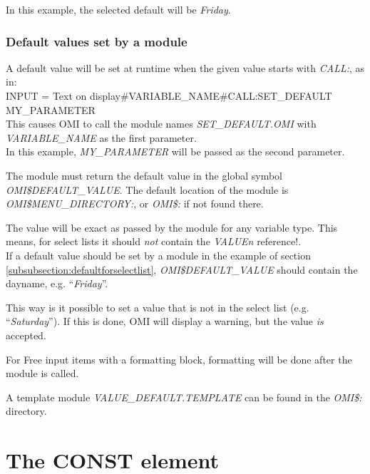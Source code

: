 \documentclass[a4paper]{book}
\newcommand{\vs}{\vspace{3mm}}
\renewcommand{\indent}{\hspace*{5mm}}
\begin{document}
In this example, the selected default will be \textsl{Friday}.

\subsubsection{Default values set by a module}\label{subsubsection:defaultbymodule}

A default value will be set at runtime when the given value starts with \textsl{CALL:}, as in:\\
\indent\textsf{INPUT = Text on display{\#}VARIABLE{\_}NAME{\#}CALL:SET{\_}DEFAULT MY{\_}PARAMETER}\\
This causes OMI to call the module names \textsl{SET{\_}DEFAULT.OMI} with \textsl{VARIABLE{\_}NAME} as the first
parameter.\\
In this example, \textsl{MY{\_}PARAMETER} will be passed as the second parameter.

The module must return the default value in the global symbol \textsl{OMI{\$}DEFAULT{\_}VALUE}. The default location of the module is \textsl{OMI{\$}MENU{\_}DIRECTORY:}, or \textsl{OMI{\$}:} if not found there.

\vs

The value will be exact as passed by the module for any variable type. This means, for select lists it should \textit{not} contain the \textsl{VALUE\textit{n}} reference!.\\
If a default value should be set by a module in the example of section \ref{subsubsection:defaultforselectlist},
\textsl{OMI{\$}DEFAULT{\_}VALUE} should contain the dayname, e.g. ``\textsl{Friday}''.

This way is it possible to set a value that is not in the select list (e.g. ``\textsl{Saturday}''). If this is done, OMI will display a warning, but the value \textit{is} accepted.

\vs

For Free input items with a formatting block, formatting will be done after the module is called.

\vs

A template module \textsl{VALUE{\_}DEFAULT.TEMPLATE} can be found in the \textsl{OMI{\$}:} directory.


\section{The CONST element}\label{sec:const}
\end{document}

